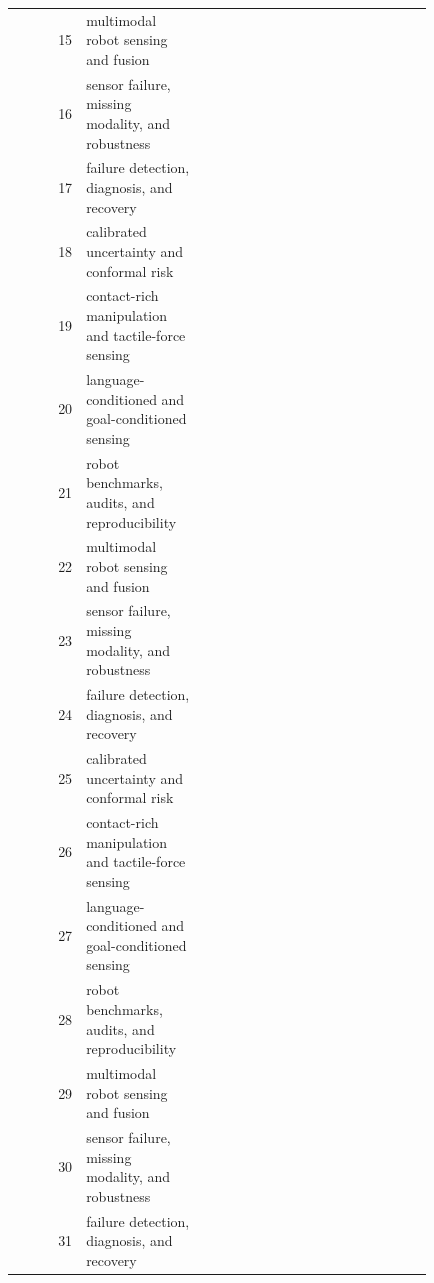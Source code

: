 \documentclass{article}
\begin{document}
\begin{longtable}{@{}r p{0.28\linewidth} p{0.55\linewidth}@{}}
15 & multimodal robot sensing and fusion & \citep{fang2026when43,song2021multimodal44,arkin2020multimodal45} \\
16 & sensor failure, missing modality, and robustness & \citep{velasquez2022multisensor46,thiyagarajan2017predictive47,kim2022parasitic48} \\
17 & failure detection, diagnosis, and recovery & \citep{kim2020boron49,ali2025timetofault50,feliutalegon2021control51} \\
18 & calibrated uncertainty and conformal risk & \citep{yang2026edgebased52,dallalibera2011biologically53,kim2012robust54} \\
19 & contact-rich manipulation and tactile-force sensing & \citep{fabien2026comparative55,xu2021a56,yamaguchi2019tactile57} \\
20 & language-conditioned and goal-conditioned sensing & \citep{nam2020robust58,shin2003fault59,silva2018robust60} \\
21 & robot benchmarks, audits, and reproducibility & \citep{mahoney2016on61,gardner2020a62,chennddynamic63} \\
22 & multimodal robot sensing and fusion & \citep{ge2025vlamp64,angeletti2022a65,huang2026mcotvla66} \\
23 & sensor failure, missing modality, and robustness & \citep{mohammad2024a67,suk2025uncertaintyaware68,kluber2022when69} \\
24 & failure detection, diagnosis, and recovery & \citep{fletcher2010randomized70,jamone2015highly71,rollinson2013robust72} \\
25 & calibrated uncertainty and conformal risk & \citep{srikanth2026redteaming73,rosa2025smart74,soika2002a75} \\
26 & contact-rich manipulation and tactile-force sensing & \citep{shaheryar2016a76,liu2025triboelectric77,srivastava2025demystifying78} \\
27 & language-conditioned and goal-conditioned sensing & \citep{jung2024learning79,swietlicka2020robot80,lou2023dcyolov881} \\
28 & robot benchmarks, audits, and reproducibility & \citep{yang2022topographic82,wang2007robust83,shi2024learning84} \\
29 & multimodal robot sensing and fusion & \citep{alejo2019a85,li2025simultaneous86,imura2002robust87} \\
30 & sensor failure, missing modality, and robustness & \citep{mahajan2021vayu88,ashokaraj2008robust89,peng2021robust90} \\
31 & failure detection, diagnosis, and recovery & \citep{zhang2017robust91,shen2022highstretchability92,schreiter2023advantages93} \\

\end{longtable}
\end{document}
